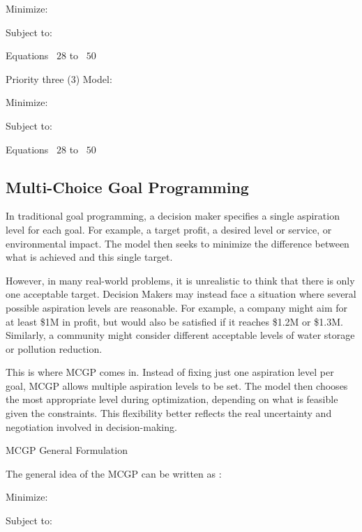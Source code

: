 Minimize:
        \EqLGPObjectivePriorityTwoThirtySix

Subject to:
         \begin{center}
        Equations ~$28$ to ~$50$
        \end{center}  
        \EqLGPObjectivePriorityOneConstraintThirtyEight

Priority three (3) Model:

Minimize:
        \EqLGPObjectivePriorityThreeThirtySeven

Subject to:
        \begin{center}
        Equations ~$28$ to ~$50$
        \end{center}   
        \EqLGPObjectivePriorityOneConstraintThirtyEight
        \EqLGPObjectivePriorityTwoConstraintThirtyNine

\subsection{Multi-Choice Goal Programming}
In traditional goal programming, a decision maker specifies a single aspiration level for each goal. For example, a target profit, a desired level or service, or environmental impact. The model then seeks to minimize the difference between what is achieved and this single target.

However, in many real-world problems, it is unrealistic to think that there is only one acceptable target. Decision Makers may instead face a situation where several possible aspiration levels are reasonable. For example, a company might aim for at least \$1M in profit, but would also be satisfied if it reaches \$1.2M or \$1.3M. Similarly, a community might consider different acceptable levels of water storage or pollution reduction.

This is where \gls{MCGP} comes in. Instead of fixing just one aspiration level per goal, MCGP allows multiple aspiration levels to be set. The model then chooses the most appropriate level during optimization, depending on what is feasible given the constraints. This flexibility better reflects the real uncertainty and negotiation involved in decision-making.

MCGP General Formulation

The general idea of the MCGP can be written as \cite{CHANG2007}:

Minimize:
       \EqMCGPObjectiveFourty

Subject to:
       \EqMCGPConstraintFourtyOne

